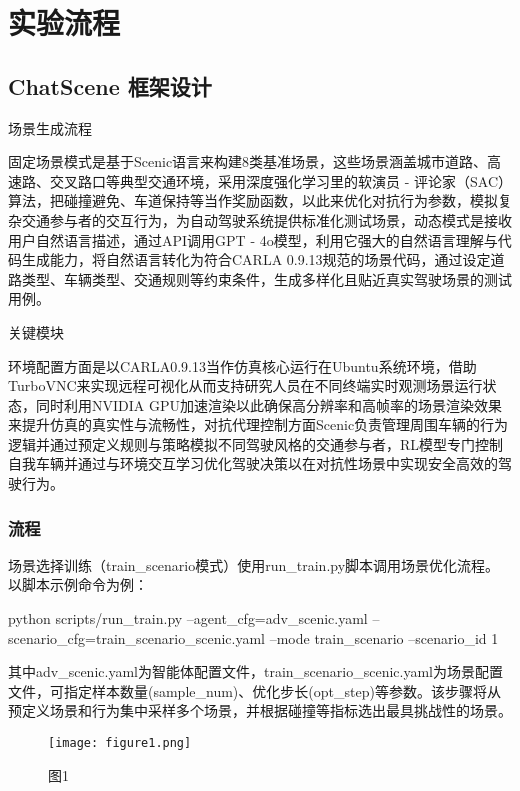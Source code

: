 \chapter{实验流程}

\section{ChatScene 框架设计}

场景生成流程

固定场景模式是基于Scenic语言来构建8类基准场景，这些场景涵盖城市道路、高速路、交叉路口等典型交通环境，采用深度强化学习里的软演员 - 评论家（SAC）算法，把碰撞避免、车道保持等当作奖励函数，以此来优化对抗行为参数，模拟复杂交通参与者的交互行为，为自动驾驶系统提供标准化测试场景，动态模式是接收用户自然语言描述，通过API调用GPT - 4o模型，利用它强大的自然语言理解与代码生成能力，将自然语言转化为符合CARLA 0.9.13规范的场景代码，通过设定道路类型、车辆类型、交通规则等约束条件，生成多样化且贴近真实驾驶场景的测试用例。


关键模块

环境配置方面是以CARLA0.9.13当作仿真核心运行在Ubuntu系统环境，借助TurboVNC来实现远程可视化从而支持研究人员在不同终端实时观测场景运行状态，同时利用NVIDIA GPU加速渲染以此确保高分辨率和高帧率的场景渲染效果来提升仿真的真实性与流畅性，对抗代理控制方面Scenic负责管理周围车辆的行为逻辑并通过预定义规则与策略模拟不同驾驶风格的交通参与者，RL模型专门控制自我车辆并通过与环境交互学习优化驾驶决策以在对抗性场景中实现安全高效的驾驶行为\cite{benmimoun2014detection}。

\subsection{流程}

场景选择训练（train\_scenario模式）使用run\_train.py脚本调用场景优化流程。以脚本示例命令为例：

python scripts/run\_train.py --agent\_cfg=adv\_scenic.yaml --scenario\_cfg=train\_scenario\_scenic.yaml --mode train\_scenario --scenario\_id 1

其中adv\_scenic.yaml为智能体配置文件，train\_scenario\_scenic.yaml为场景配置文件，可指定样本数量(sample\_num)、优化步长(opt\_step)等参数。该步骤将从预定义场景和行为集中采样多个场景，并根据碰撞等指标选出最具挑战性的场景。

\begin{figure}[htbp]
	\centering
	\texttt{[image: figure1.png]} %
	\caption{图1} %
	\label{fig:example} %
\end{figure}


